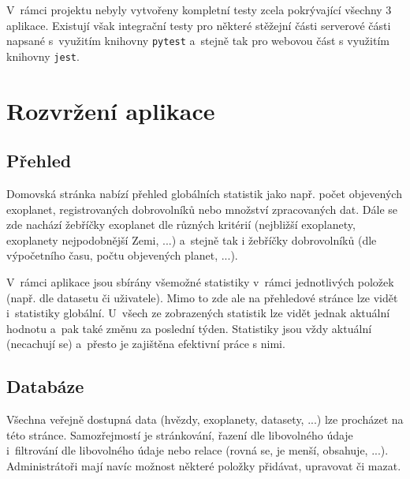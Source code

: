 \documentclass[a4paper,12pt]{article}
\def\code#1{\texttt{#1}}
\begin{document}
{{{{{{{{{{{V~rámci projektu nebyly vytvořeny kompletní testy zcela pokrývající všechny 3 aplikace. Existují však integrační testy pro některé stěžejní části serverové části napsané s~využitím knihovny \code{pytest} a~stejně tak pro webovou část s využitím knihovny \code{jest}.



\section{Rozvržení aplikace}

\subsection{Přehled}

Domovská stránka nabízí přehled globálních statistik jako např. počet objevených exoplanet, registrovaných dobrovolníků nebo množství zpracovaných dat. Dále se zde nachází žebříčky exoplanet dle různých kritérií (nejbližší exoplanety, exoplanety nejpodobnější Zemi, ...) a~stejně tak i žebříčky dobrovolníků (dle výpočetního času, počtu objevených planet, ...).




V~rámci aplikace jsou sbírány všemožné statistiky v~rámci jednotlivých položek (např. dle datasetu či uživatele). Mimo to zde ale na přehledové stránce lze vidět i~statistiky globální. U~všech ze zobrazených statistik lze vidět jednak aktuální hodnotu a~pak také změnu za poslední týden. Statistiky jsou vždy aktuální (necachují se) a~přesto je zajištěna efektivní práce s nimi.


\clearpage

\subsection{Databáze}

Všechna veřejně dostupná data (hvězdy, exoplanety, datasety, ...) lze procházet na této stránce. Samozřejmostí je stránkování, řazení dle libovolného údaje i~filtrování dle libovolného údaje nebo relace (rovná se, je menší, obsahuje, ...). Administrátoři mají navíc možnost některé položky přidávat, upravovat či mazat.


}}}}}}}}}}}
\end{document}
